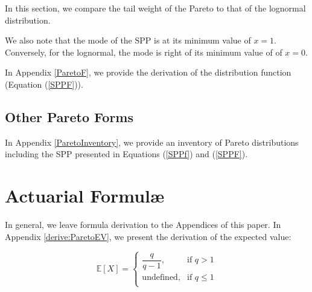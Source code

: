 In this section, we compare the tail weight of the Pareto to that of the lognormal distribution.

We also note that the mode of the SPP is at its minimum value of $x = 1$. Conversely, for the lognormal, the mode is right of its minimum value of  of $x = 0$.

In  Appendix \ref{ParetoF}, we provide the derivation of the distribution function (Equation (\ref{SPPF})).

\subsection{Other Pareto Forms}
In Appendix \ref{ParetoInventory}, we provide an inventory of Pareto distributions including the SPP presented in Equations (\ref{SPPf}) and (\ref{SPPF}). 

\section{Actuarial Formul\ae}
In general, we leave formula derivation to the Appendices of this paper. In Appendix \ref{derive:ParetoEV}, we present the derivation of the expected value:

\begin{equation}
\mathbb{E}[X]  = 
\begin{cases}
\dfrac{q}{q-1},& \text{if } q > 1\\
\text{undefined},& \text{if } q \leq 1\\         
\end{cases}
\end{equation}
